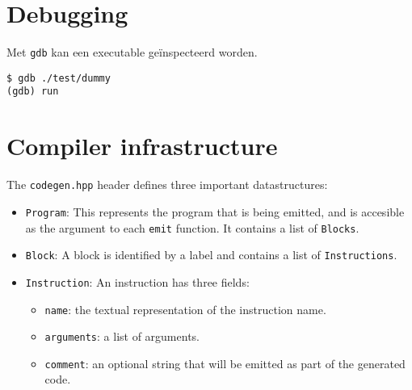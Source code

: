 \documentclass{report}
\begin{document}
	\section{Debugging}
	Met \texttt{gdb} kan een executable geïnspecteerd worden.
	\begin{lstlisting}
$ gdb ./test/dummy
(gdb) run

	\end{lstlisting}
	
	\section{Compiler infrastructure}
	The \texttt{codegen.hpp} header defines three important datastructures:
	\begin{itemize}
		\item \texttt{Program}: This represents the program that is being emitted, and is accesible as the argument to each \texttt{emit} function. It contains a list of \texttt{Blocks}.
		\item \texttt{Block}: A block is identified by a label and contains a list of \texttt{Instructions}.
		\item \texttt{Instruction}: An instruction has three fields:
		\begin{itemize}
			\item \texttt{name}: the textual representation of the instruction name.
			\item \texttt{arguments}: a list of arguments.
			\item \texttt{comment}: an optional string that will be emitted as part of the generated code.
		\end{itemize}
	\end{itemize}
\end{document}
